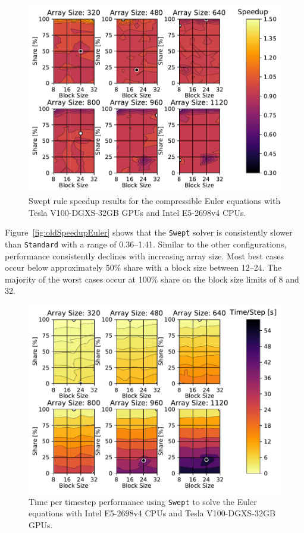 \documentclass[mca,article,submit,moreauthors,pdftex]{Definitions/mdpi}
\def\Swept{\texttt{Swept}}
\def\Standard{\texttt{Standard}}
\def\newCPU{Intel E5-2698v4} %
\def\newGPU{Tesla V100-DGXS-32GB}
\begin{document}
\begin{figure}[htbp]
\widefigure
    \includegraphics[scale=0.85]{figs/speedUpeulerNew.pdf}
    \caption{Swept rule speedup results  for the compressible Euler equations with \newGPU{} GPUs and \newCPU{} CPUs.}
    \label{fig:newSpeedupEuler}
\end{figure}
\begin{paracol}{2}
\linenumbers
\switchcolumn

Figure~\ref{fig:oldSpeedupEuler} shows that the \Swept{} solver is consistently slower than \Standard{} with a range of 0.36--1.41. Similar to the other configurations, performance consistently declines with increasing array size. Most best cases occur below approximately 50\% share with a block size between 12--24. The majority of the worst cases occur at 100\% share on the block size limits of 8 and 32.


\end{paracol}
\nointerlineskip

\begin{figure}[htbp]
    \widefigure
    \includegraphics[scale=0.85]{figs/timePerStepSwepteulerNew.pdf}
    \caption{Time per timestep performance using \Swept{} to solve the Euler equations with \newCPU{} CPUs and \newGPU{} GPUs.}
    \label{fig:tptNewEulerSwept} 
\end{figure}
\end{document}
